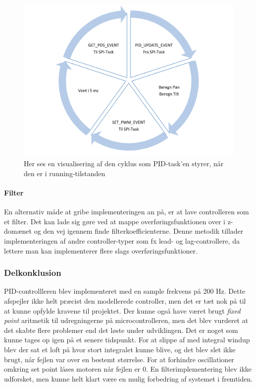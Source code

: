 \begin{figure}[ht]
	\begin{center}
	\includegraphics[scale=0.5]{Billeder/PID_update.png}
	\end{center}		
	\caption{Her ses en visualisering af den cyklus som PID-task'en styrer, når den er i running-tilstanden}
	\label{fig:PID_update}
\end{figure}

\paragraph{Filter}
En alternativ måde at gribe implementeringen an på, er at lave controlleren som et filter. Det kan lade sig gøre ved at mappe overføringsfunktionen over i z-domænet og den vej igennem finde filterkoefficienterne. Denne metodik tillader implementeringen af andre controller-typer som fx lead- og lag-controllere, da lettere man kan implementerer flere slags overføringsfunktioner.

\subsubsection{Delkonklusion}

PID-controllleren blev implementeret med en sample frekvens på 200 Hz. Dette afspejler ikke helt præcist den modellerede controller, men det er tæt nok på til at kunne opfylde kravene til projektet. Der kunne også have været brugt \textit{fixed point} aritmetik til udregningerne på microcontrolleren, men det blev vurderet at det skabte flere problemer end det løste under udviklingen. Det er noget som kunne tages op igen på et senere tidspunkt. For at slippe af med integral windup blev der sat et loft på hvor stort integralet kunne blive, og det blev slet ikke brugt, når fejlen var over en bestemt størrelse. For at forhindre oscillationer omkring set point låses motoren når fejlen er 0. En filterimplementering blev ikke udforsket, men kunne helt klart være en mulig forbedring af systemet i fremtiden.

